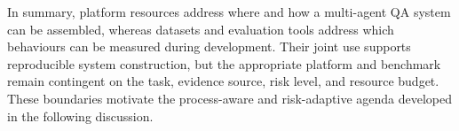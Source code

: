 In summary, platform resources address where and how a multi-agent QA system
can be assembled, whereas datasets and evaluation tools address which
behaviours can be measured during development. Their joint use supports
reproducible system construction, but the appropriate platform and benchmark
remain contingent on the task, evidence source, risk level, and resource
budget. These boundaries motivate the process-aware and risk-adaptive agenda
developed in the following discussion.
